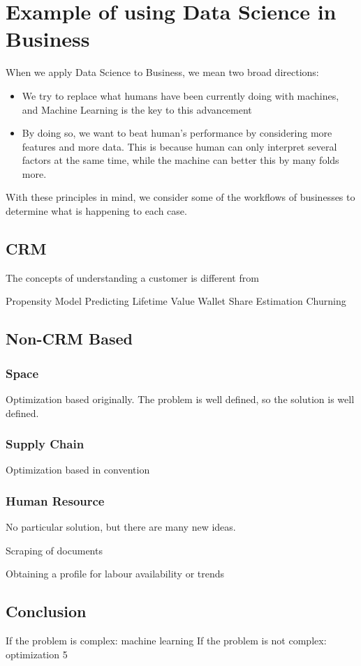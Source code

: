 \section{Example of using Data Science in Business}
\label{sec:01_DS_business}

When we apply Data Science to Business, we mean two broad directions:

\begin{itemize}
\item We try to replace what humans have been currently doing with machines, and Machine Learning is the key to this advancement
\item By doing so, we want to beat human's performance by considering more features and more data.  This is because human can only interpret several factors at the same time, while the machine can better this by many folds more.  
\end{itemize}

With these principles in mind, we consider some of the workflows of businesses to determine what is happening to each case.  

\subsection{CRM}

The concepts of understanding a customer is different from 

Propensity Model 
Predicting Lifetime Value
Wallet Share Estimation 
Churning 



\subsection{Non-CRM Based}

\subsubsection{Space}

Optimization based originally.  The problem is well defined, so the solution is well defined.  

\subsubsection{Supply Chain}

Optimization based in convention

\subsubsection{Human Resource}

No particular solution, but there are many new ideas.  

Scraping of documents

Obtaining a profile for labour availability or trends




\subsection{Conclusion}

If the problem is complex: machine learning
If the problem is not complex: optimization  5

\newpage